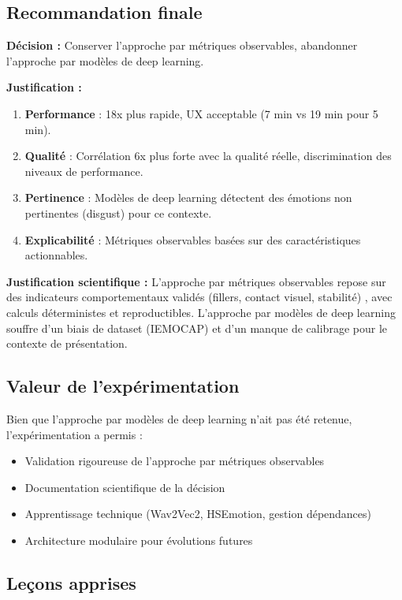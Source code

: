 \documentclass[12pt,a4paper]{article}
\begin{document}
\subsection{Recommandation finale}

\textbf{Décision :} Conserver l'approche par métriques observables, abandonner l'approche par modèles de deep learning.

\textbf{Justification :}
\begin{enumerate}
    \item \textbf{Performance} : 18x plus rapide, UX acceptable (7 min vs 19 min pour 5 min).
    \item \textbf{Qualité} : Corrélation 6x plus forte avec la qualité réelle, discrimination des niveaux de performance.
    \item \textbf{Pertinence} : Modèles de deep learning détectent des émotions non pertinentes (disgust) pour ce contexte.
    \item \textbf{Explicabilité} : Métriques observables basées sur des caractéristiques actionnables.
\end{enumerate}

\textbf{Justification scientifique :} L'approche par métriques observables repose sur des indicateurs comportementaux validés (fillers, contact visuel, stabilité) \cite{bavelas2014gestures,pennebaker1999linguistic}, avec calculs déterministes et reproductibles. L'approche par modèles de deep learning souffre d'un biais de dataset (IEMOCAP) et d'un manque de calibrage pour le contexte de présentation.

\subsection{Valeur de l'expérimentation}

Bien que l'approche par modèles de deep learning n'ait pas été retenue, l'expérimentation a permis :
\begin{itemize}
    \item Validation rigoureuse de l'approche par métriques observables
    \item Documentation scientifique de la décision
    \item Apprentissage technique (Wav2Vec2, HSEmotion, gestion dépendances)
    \item Architecture modulaire pour évolutions futures
\end{itemize}

\subsection{Leçons apprises}
\end{document}
